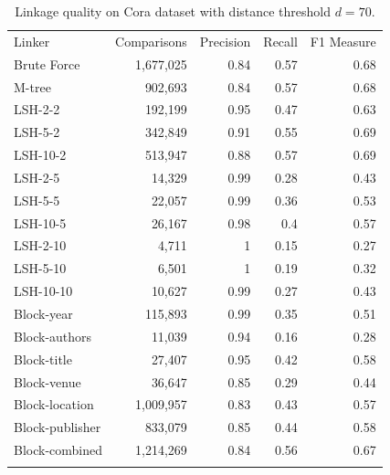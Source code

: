 \documentclass{llncs}
\begin{document}
\begin{table}[ht]
\caption{Linkage quality on Cora dataset with distance threshold
  $d= 70$.}
  \label{comparison-of-results-cora}
  \centering
  \begin{footnotesize}
  \begin{tabular}{lrrrr} \hline\noalign{\smallskip}
\parbox{0.2\textwidth}{\centering Linker} &
\parbox{0.2\textwidth}{\centering Comparisons} &
\parbox{0.17\textwidth}{\centering Precision} &
\parbox{0.17\textwidth}{\centering Recall} &
\parbox{0.17\textwidth}{\centering F1 Measure} \\
  \noalign{\smallskip} \hline \noalign{\smallskip}
Brute Force        & 1,677,025                 & 0.84      & 0.57   & 0.68  \\
\noalign{\smallskip} \hline \noalign{\smallskip}
M-tree              &  902,693                  & 0.84      & 0.57   & 0.68       \\
\noalign{\smallskip} \hline \noalign{\smallskip}
LSH-2-2            &  192,199	& 0.95	& 0.47	& 0.63       \\
LSH-5-2            &  342,849	& 0.91	& 0.55	& 0.69       \\
LSH-10-2           &  513,947	& 0.88	& 0.57	& 0.69       \\
LSH-2-5            &  14,329	& 0.99	& 0.28	& 0.43      \\
LSH-5-5            &  22,057	& 0.99	& 0.36	& 0.53       \\
LSH-10-5           &  26,167	& 0.98	& 0.4	& 0.57      \\
LSH-2-10           &  4,711	& 1	& 0.15	& 0.27    \\
LSH-5-10           &  6,501	& 1	& 0.19	& 0.32      \\
LSH-10-10          & 10,627  	& 0.99	& 0.27& 	0.43       \\
\noalign{\smallskip} \hline \noalign{\smallskip}
Block-year         &  115,893                  & 0.99      & 0.35   & 0.51       \\
Block-authors      &   11,039                   & 0.94      & 0.16   & 0.28       \\
Block-title        &   27,407                   & 0.95      & 0.42   & 0.58       \\
Block-venue        &   36,647                   & 0.85      & 0.29   & 0.44       \\
Block-location     & 1,009,957                 & 0.83      & 0.43   & 0.57       \\
Block-publisher    &  833,079                  & 0.85      & 0.44   & 0.58       \\
Block-combined     & 1,214,269                 & 0.84      & 0.56   & 0.67       \\
\noalign{\smallskip} \hline
\end{tabular}
\end{footnotesize}
\end{table}
\end{document}
